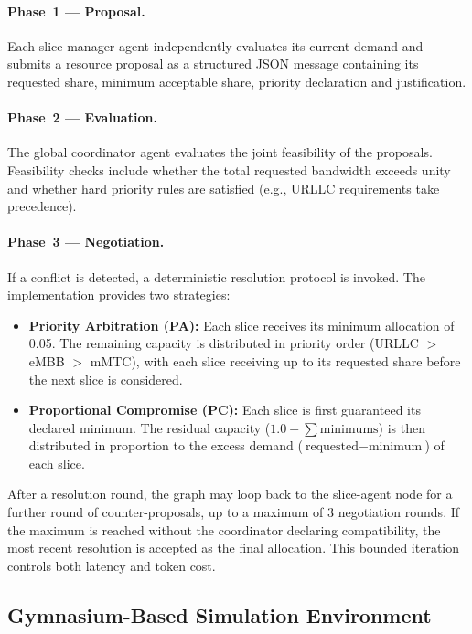 \paragraph{Phase~1 --- Proposal.} Each slice-manager agent independently evaluates its current demand and submits a resource proposal as a structured JSON message containing its requested share, minimum acceptable share, priority declaration and justification.

\paragraph{Phase~2 --- Evaluation.} The global coordinator agent evaluates the joint feasibility of the proposals. Feasibility checks include whether the total requested bandwidth exceeds unity and whether hard priority rules are satisfied (e.g., URLLC requirements take precedence).

\paragraph{Phase~3 --- Negotiation.} If a conflict is detected, a deterministic resolution protocol is invoked. The implementation provides two strategies:

\begin{itemize}
    \item \textbf{Priority Arbitration (PA):} Each slice receives its minimum allocation of 0.05. The remaining capacity is distributed in priority order (URLLC $>$ eMBB $>$ mMTC), with each slice receiving up to its requested share before the next slice is considered.

    \item \textbf{Proportional Compromise (PC):} Each slice is first guaranteed its declared minimum. The residual capacity ($1.0 - \sum \text{minimums}$) is then distributed in proportion to the excess demand ($\text{requested} - \text{minimum}$) of each slice.
\end{itemize}

After a resolution round, the graph may loop back to the slice-agent node for a further round of counter-proposals, up to a maximum of 3 negotiation rounds. If the maximum is reached without the coordinator declaring compatibility, the most recent resolution is accepted as the final allocation. This bounded iteration controls both latency and token cost.

\subsection{Gymnasium-Based Simulation Environment}

